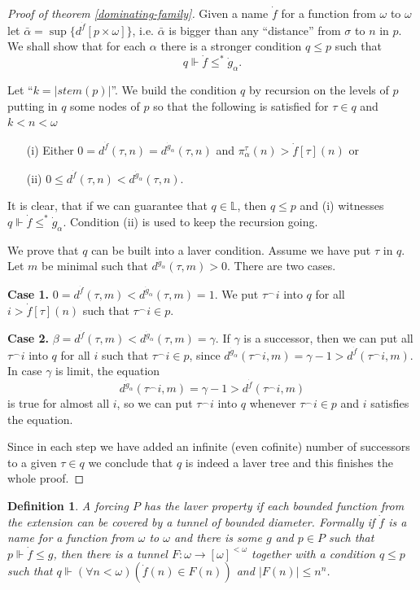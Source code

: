 \documentclass[a4paper,11pt,oneside]{mybook}
\def\force{\Vdash}
\def\conc{{^\smallfrown}}
\theoremstyle{theorem}
\newtheorem{definition}[subsection]{Definition}
\theoremstyle{example}
\begin{document}
\begin{proof}[Proof of theorem \ref{dominating-family}]
Given a name $\dot{f}$ for a function from $\omega$ to $\omega$ let $\bar{\alpha}=\sup\{d^{\dot{f}}[p\times\omega]\}$, i.e. $\bar{\alpha}$ is bigger
than any ``distance'' from $\sigma$ to $n$ in $p$. We shall show that for each $\alpha$ there is a stronger condition $q\leq p$ such that
$$
q\force \dot{f}\leq^*{\dot{g}_\alpha}.
$$

Let ``$k=|stem(p)|$''. We build the condition $q$ by recursion on the levels of $p$ putting in $q$ some nodes of $p$ so that the following is satisfied for $\tau\in q$ and
$k<n<\omega$
\begin{itemize}
 \item[(i)] Either $0=d^{\dot{f}}(\tau,n)=d^{{\dot{g}_\alpha}}(\tau,n)$ and $\pi_\alpha^\tau(n)>\dot{f}[\tau](n)$ or
 \item[(ii)] $0\leq d^{\dot{f}}(\tau,n)<d^{{\dot{g}_\alpha}}(\tau,n)$.
\end{itemize}
It is clear, that if we can guarantee that $q\in \mathbb{L}$, then $q\leq p$ and (i) witnesses $q\force\dot{f}\leq^*{\dot{g}_\alpha}$. Condition (ii) is used to keep the
recursion going.

We prove that $q$ can be built into a laver condition. Assume we have put $\tau$ in $q$. Let $m$ be minimal such that $d^{{\dot{g}_\alpha}}(\tau,m) > 0$. There are two
cases.

{\bf Case 1.} $0=d^{\dot{f}}(\tau,m) < d^{{\dot{g}_\alpha}}(\tau,m)=1$. We put $\tau\conc i$ into $q$ for all $i > \dot{f}[\tau](n)$ such that $\tau\conc i\in p$.

{\bf Case 2.} $\beta=d^{\dot{f}}(\tau,m) < d^{{\dot{g}_\alpha}}(\tau,m)=\gamma$. If $\gamma$ is a successor, then we can put all $\tau\conc i$ into $q$ for all $i$ such that
$\tau\conc i\in p$, since $d^{{\dot{g}_\alpha}}(\tau\conc i,m)=\gamma-1>d^{\dot{f}}(\tau\conc i,m)$. In case $\gamma$ is limit, the equation
$$
d^{{\dot{g}_\alpha}}(\tau\conc i,m)=\gamma-1>d^{\dot{f}}(\tau\conc i,m)
$$
is true for almost all $i$, so we can put $\tau\conc i$ into $q$ whenever $\tau\conc i\in p$ and $i$ satisfies the equation.

Since in each step we have added an infinite (even cofinite) number of successors to a given $\tau\in q$ we conclude that $q$ is indeed a laver tree and
this finishes the whole proof.

\end{proof}


\begin{definition} A forcing $P$ has the \emph{laver property} if each bounded function from the extension can be covered by a tunnel of bounded diameter. Formally
if $\dot{f}$ is a name for a function from $\omega$ to $\omega$ and there is some $g$ and $p\in P$ such that $p\force \dot{f}\leq g$, then there is a tunnel
$F:\omega\to[\omega]^{<\omega}$ together with a condition $q\leq p$ such that $q\force(\forall n<\omega)(\dot{f}(n)\in F(n))$ and $|F(n)|\leq n^n$.
\end{definition}
\end{document}
